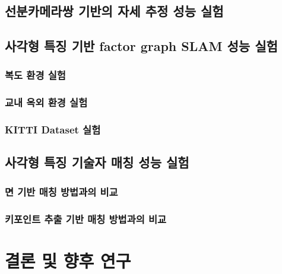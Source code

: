 \documentclass[master,korean,final]{cbnu-ecs}
\begin{document}
\section{선분카메라쌍 기반의 자세 추정 성능 실험}
\section{사각형 특징 기반 factor graph SLAM 성능 실험}
\subsection{복도 환경 실험}
\subsection{교내 옥외 환경 실험}
\subsection{KITTI Dataset 실험}
\section{사각형 특징 기술자 매칭 성능 실험}
\subsection{면 기반 매칭 방법과의 비교}
\subsection{키포인트 추출 기반 매칭 방법과의 비교}

\chapter{결론 및 향후 연구}


%
%
%
\end{document}
